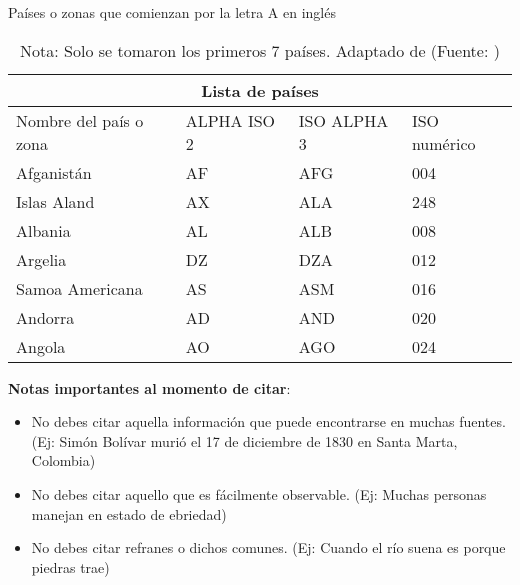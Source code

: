 \begin{table}[H]
\caption{Países o zonas que comienzan por la letra A en inglés}
\label{paises}
\centering
\begin{tabular}{ |p{3.5cm}|p{2.5cm}|p{2.5cm}|p{2.5cm}|  }
 \hline
 \multicolumn{4}{|c|}{Lista de países} \\
 \hline
 Nombre del país o zona & ALPHA ISO  2  & ISO ALPHA 3 & ISO numérico\\
 \hline
 Afganistán   & AF    &AFG&   004\\
 Islas Aland&   AX  & ALA   &248\\
 Albania &AL & ALB&  008\\
 Argelia   &DZ & DZA&  012\\
 Samoa Americana&   AS  & ASM&016\\
 Andorra& AD  & AND   &020\\
 Angola& AO  & AGO&024\\
 \hline
\end{tabular}
\caption*{Nota: Solo se tomaron los primeros 7 países. Adaptado de (Fuente: \textcite{tables})}
\end{table}

\noindent\textbf{Notas importantes al momento de citar}:

\begin{itemize}
\item No debes citar aquella información que puede encontrarse en muchas fuentes. (Ej: Simón Bolívar murió el 17 de diciembre de 1830 en Santa Marta, Colombia)
\item No debes citar aquello que es fácilmente observable. (Ej: Muchas personas manejan en estado de ebriedad)
\item No debes citar refranes o dichos comunes. (Ej: Cuando el río suena es porque piedras trae)
\end{itemize}

